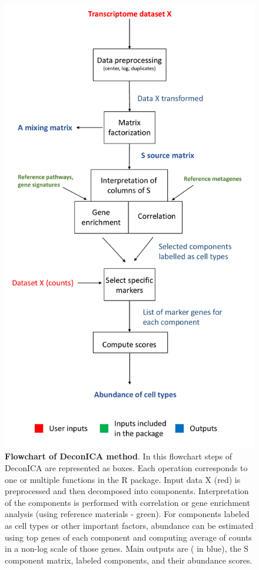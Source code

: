 \documentclass[12pt,]{book}
\theoremstyle{definition}
\theoremstyle{definition}
\theoremstyle{definition}
\theoremstyle{remark}
\begin{document}
\begin{figure}

{\centering \includegraphics[height=0.8\textheight]{figures-ext/deconica_schema} 

}

\caption[Flowchart of DeconICA method]{\textbf{Flowchart of DeconICA method}. In
this flowchart steps of DeconICA are represented as boxes. Each
operation corresponds to one or multiple functions in the R package.
Input data X (red) is preprocessed and then decomposed into components.
Interpretation of the components is performed with correlation or gene
enrichment analysis (using reference materials - green). For components
labeled as cell types or other important factors, abundance can be
estimated using top genes of each component and computing average of
counts in a non-log scale of those genes. Main outputs are ( in blue),
the S component matrix, labeled components, and their abundance scores.}\label{fig:deconicaschema}
\end{figure}
\end{document}
